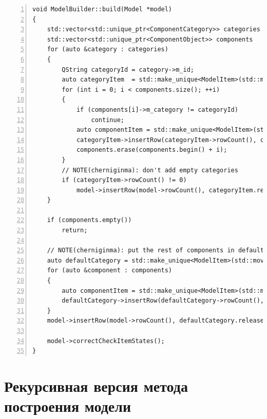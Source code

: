 \documentclass[bachelor, och, pract]{SCWorks}
\begin{document}
\begin{Verbatim}[fontsize=\small,breaklines=true,numbers=left]
void ModelBuilder::build(Model *model)
{
    std::vector<std::unique_ptr<ComponentCategory>> categories = buildCategories();
    std::vector<std::unique_ptr<ComponentObject>> components   = buildObjects();
    for (auto &category : categories)
    {
        QString categoryId = category->m_id;
        auto categoryItem  = std::make_unique<ModelItem>(std::move(category));
        for (int i = 0; i < components.size(); ++i)
        {
            if (components[i]->m_category != categoryId)
                continue;
            auto componentItem = std::make_unique<ModelItem>(std::move(components[i]));
            categoryItem->insertRow(categoryItem->rowCount(), componentItem.release());
            components.erase(components.begin() + i);
        }
        // NOTE(cherniginma): don't add empty categories
        if (categoryItem->rowCount() != 0)
            model->insertRow(model->rowCount(), categoryItem.release());
    }

    if (components.empty())
        return;

    // NOTE(cherniginma): put the rest of components in default category
    auto defaultCategory = std::make_unique<ModelItem>(std::move(buildDefaultCategory()));
    for (auto &component : components)
    {
        auto componentItem = std::make_unique<ModelItem>(std::move(component));
        defaultCategory->insertRow(defaultCategory->rowCount(), componentItem.release());
    }
    model->insertRow(model->rowCount(), defaultCategory.release());

    model->correctCheckItemStates();
}

\end{Verbatim}

\section{Рекурсивная версия метода построения модели}\label{newbuild}
\end{document}

